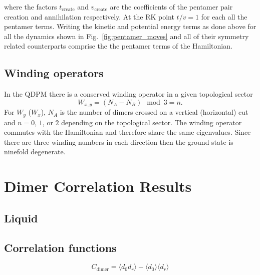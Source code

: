 \documentclass[twocolumn,prb,aps,floatfix,superscriptaddress]{revtex4-1}
\begin{document}
        where the factors $t_{\mathrm{create}}$ and $v_{\mathrm{create}}$ are the coefficients of
        the pentamer pair creation and annihilation respectively. At the RK point
        $t/v=1$ for each all the pentamer terms. 
        Writing the kinetic and potential energy terms as done above for all the dynamics shown in
        Fig.~\ref{fig:pentamer_moves} and all of their symmetry related counterparts comprise the
        the pentamer terms of the Hamiltonian. 

    \subsection{Winding operators}

        In the QDPM there is a conserved winding operator in a given topological sector
        \begin{equation}
            W_{x,y} = (N_A - N_B)\mod{3} = n
            .
        \end{equation}
        For $W_y$ ($W_x$), $N_A$ is the number of dimers crossed on a vertical (horizontal) cut and
        $n=0$, $1$, or $2$ depending on the topological sector. The winding operator commutes with
        the Hamiltonian and therefore share the same eigenvalues. Since there are three winding numbers in
        each direction then the ground state is ninefold degenerate.

\section{Dimer Correlation Results}

    \subsection{Liquid}


    \subsection{Correlation functions}

    \begin{equation}
        C_{\mathrm{dimer}} = \langle d_0 d_r \rangle - \langle d_0 \rangle   \langle d_r \rangle   
    \end{equation}
\end{document}
